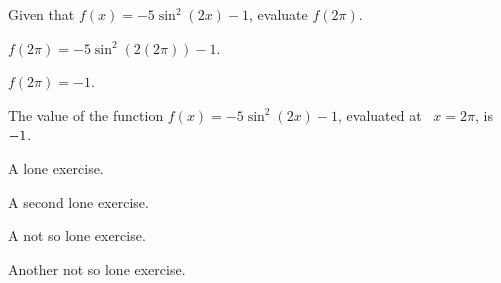 \begin{exercise}
Given that $f(x)=-5 \sin ^2(2 x)-1$, evaluate $f(2 \pi)$.
\begin{solution}
\begin{hint}
$f(2 \pi)=-5 \sin ^2(2 (2 \pi))-1$.
\end{hint}
\begin{hint}
$f(2 \pi)=-1$.
\end{hint}
The value of the function $f(x) = -5 \sin ^2(2 x)-1$, evaluated at \
$x=2 \pi$, is ${-1}$.
\end{solution}
\end{exercise}


\begin{exercise}
A lone exercise.
\end{exercise}

\begin{exercise}
A second lone exercise.
\end{exercise}


\begin{shuffle}
\begin{question}
A not so lone exercise.
\end{question}

\begin{question}
Another not so lone exercise.
\end{question}

\end{shuffle}
